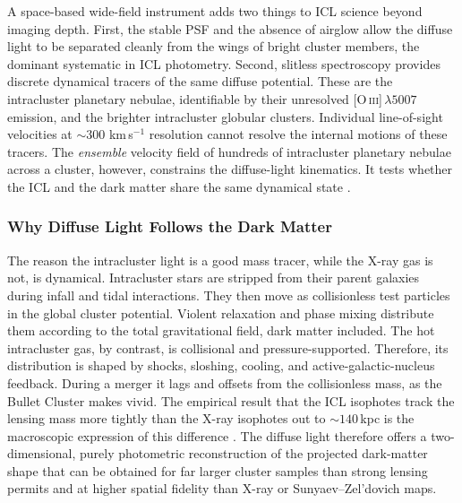 \documentclass[10pt,onecolumn]{article}
\begin{document}
A space-based wide-field instrument adds two things to ICL science beyond imaging depth. First, the stable PSF and the absence of airglow allow the diffuse light to be separated cleanly from the wings of bright cluster members, the dominant systematic in ICL photometry. Second, slitless spectroscopy provides discrete dynamical tracers of the same diffuse potential. These are the intracluster planetary nebulae, identifiable by their unresolved [O\,\textsc{iii}]\,$\lambda5007$ emission, and the brighter intracluster globular clusters. Individual line-of-sight velocities at $\sim300$ km\,s$^{-1}$ resolution cannot resolve the internal motions of these tracers. The \emph{ensemble} velocity field of hundreds of intracluster planetary nebulae across a cluster, however, constrains the diffuse-light kinematics. It tests whether the ICL and the dark matter share the same dynamical state \cite{montes2022review}.

\subsubsection{Why Diffuse Light Follows the Dark Matter}

The reason the intracluster light is a good mass tracer, while the X-ray gas is not, is dynamical. Intracluster stars are stripped from their parent galaxies during infall and tidal interactions. They then move as collisionless test particles in the global cluster potential. Violent relaxation and phase mixing distribute them according to the total gravitational field, dark matter included. The hot intracluster gas, by contrast, is collisional and pressure-supported. Therefore, its distribution is shaped by shocks, sloshing, cooling, and active-galactic-nucleus feedback. During a merger it lags and offsets from the collisionless mass, as the Bullet Cluster makes vivid. The empirical result that the ICL isophotes track the lensing mass more tightly than the X-ray isophotes out to $\sim140$\,kpc is the macroscopic expression of this difference \cite{montes2019icl}. The diffuse light therefore offers a two-dimensional, purely photometric reconstruction of the projected dark-matter shape that can be obtained for far larger cluster samples than strong lensing permits and at higher spatial fidelity than X-ray or Sunyaev--Zel'dovich maps.
\end{document}
